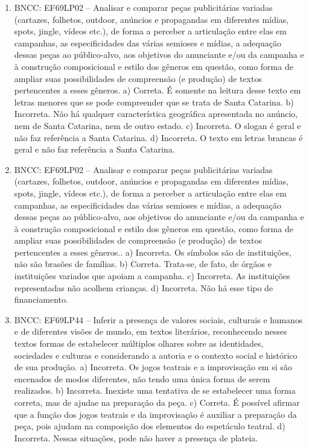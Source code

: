 \begin{enumerate}
\item
BNCC: EF69LP02 -- Analisar e comparar peças publicitárias variadas
(cartazes, folhetos, outdoor, anúncios e propagandas em diferentes
mídias, spots, jingle, vídeos etc.), de forma a perceber a articulação
entre elas em campanhas, as especificidades das várias semioses e
mídias, a adequação dessas peças ao público-alvo, aos objetivos do
anunciante e/ou da campanha e à construção composicional e estilo dos
gêneros em questão, como forma de ampliar suas possibilidades de
compreensão (e produção) de textos pertencentes a esses gêneros. a) Correta. É somente na leitura desse texto em letras menores que se pode compreender que se trata de Santa Catarina. b) Incorreta. Não há qualquer característica geográfica apresentada no anúncio, nem de Santa Catarina, nem de outro estado. c) Incorreta. O slogan é geral e não faz referência a Santa Catarina. d) Incorreta. O texto em letras brancas é geral e não faz referência a Santa Catarina.

\item
BNCC: EF69LP02 -- Analisar e comparar peças publicitárias variadas
(cartazes, folhetos, outdoor, anúncios e propagandas em diferentes
mídias, spots, jingle, vídeos etc.), de forma a perceber a articulação
entre elas em campanhas, as especificidades das várias semioses e
mídias, a adequação dessas peças ao público-alvo, aos objetivos do
anunciante e/ou da campanha e à construção composicional e estilo dos
gêneros em questão, como forma de ampliar suas possibilidades de
compreensão (e produção) de textos pertencentes a esses gêneros.. a) Incorreta. Os símbolos são de instituições, não são brasões de famílias. b) Correta. Trata-se, de fato, de órgãos e instituições variados que apoiam a campanha. c) Incorreta. As instituições representadas não acolhem crianças. d) Incorreta. Não há esse tipo de financiamento.

\item
BNCC: EF69LP44 -- Inferir a presença de valores sociais, culturais e
humanos e de diferentes visões de mundo, em textos literários,
reconhecendo nesses textos formas de estabelecer múltiplos olhares sobre
as identidades, sociedades e culturas e considerando a autoria e o
contexto social e histórico de sua produção.
 a) Incorreta. Os jogos teatrais e a improvisação em si são encenados de modos diferentes, não tendo uma única forma de serem realizados. b) Incorreta. Inexiste uma tentativa de se estabelecer uma forma correta, mas de ajudae na preparação da peça. c) Correta. É possível afirmar que a função dos jogos teatrais e da improvisação é auxiliar a preparação da peça, pois ajudam na composição dos elementos do espetáculo teatral. d) Incorreta. Nessas situações, pode não haver a presença de plateia.


\end{enumerate}
